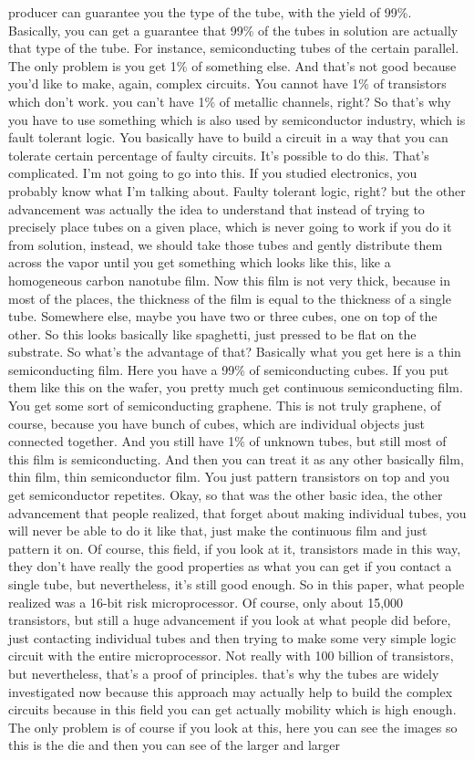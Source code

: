 producer can guarantee you the type of the tube, with the yield of 99\%. Basically, you can get a guarantee that 99\% of the tubes in solution are actually that type of the tube. For instance, semiconducting tubes of the certain parallel. The only problem is you get 1\% of something else. And that's not good because you'd like to make, again, complex circuits. You cannot have 1\% of transistors which don't work. you can't have 1\% of metallic channels, right? So that's why you have to use something which is also used by semiconductor industry, which is fault tolerant logic. You basically have to build a circuit in a way that you can tolerate certain percentage of faulty circuits. It's possible to do this. That's complicated. I'm not going to go into this. If you studied electronics, you probably know what I'm talking about. Faulty tolerant logic, right? but the other advancement was actually the idea to understand that instead of trying to precisely place tubes on a given place, which is never going to work if you do it from solution, instead, we should take those tubes and gently distribute them across the vapor until you get something which looks like this, like a homogeneous carbon nanotube film. Now this film is not very thick, because in most of the places, the thickness of the film is equal to the thickness of a single tube. Somewhere else, maybe you have two or three cubes, one on top of the other. So this looks basically like spaghetti, just pressed to be flat on the substrate. So what's the advantage of that? Basically what you get here is a thin semiconducting film. Here you have a 99\% of semiconducting cubes. If you put them like this on the wafer, you pretty much get continuous semiconducting film. You get some sort of semiconducting graphene. This is not truly graphene, of course, because you have bunch of cubes, which are individual objects just connected together. And you still have 1\% of unknown tubes, but still most of this film is semiconducting. And then you can treat it as any other basically film, thin film, thin semiconductor film. You just pattern transistors on top and you get semiconductor repetites. Okay, so that was the other basic idea, the other advancement that people realized, that forget about making individual tubes, you will never be able to do it like that, just make the continuous film and just pattern it on. Of course, this field, if you look at it, transistors made in this way, they don't have really the good properties as what you can get if you contact a single tube, but nevertheless, it's still good enough. So in this paper, what people realized was a 16-bit risk microprocessor. Of course, only about 15,000 transistors, but still a huge advancement if you look at what people did before, just contacting individual tubes and then trying to make some very simple logic circuit with the entire microprocessor. Not really with 100 billion of transistors, but nevertheless, that's a proof of principles. that's why the tubes are widely investigated now because this approach may actually help to build the complex circuits because in this field you can get actually mobility which is high enough. The only problem is of course if you look at this, here you can see the images so this is the die and then you can see of the larger and larger 